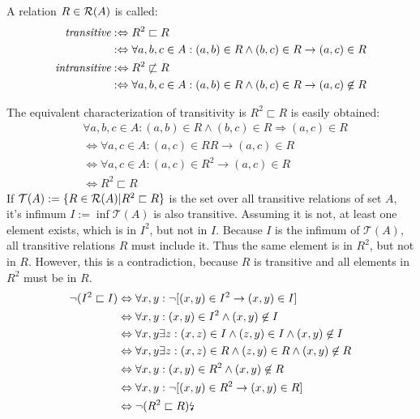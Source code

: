 \begin{definition}[Transitivity]
A relation $R \in \mathcal{R}(A)$ is called:
\begin{align}
\emph{transitive} 
&:\Leftrightarrow
R^{2} \sqsubset R
\\&:\Leftrightarrow
\forall a,b,c \in A: (a,b) \in R \wedge (b,c) \in R \rightarrow (a,c) \in R
\\
\emph{intransitive} 
&:\Leftrightarrow
R^{2} \not\sqsubset R
\\&:\Leftrightarrow
\forall a,b,c \in A: (a,b) \in R \wedge (b,c) \in R \rightarrow (a,c) \not\in R
\end{align}
\end{definition}
The equivalent characterization of transitivity is $R^{2} \sqsubset R$ is easily obtained:
\begin{align}
&\forall a,b,c \in A: (a,b) \in R \wedge (b,c) \in R \Rightarrow (a,c) \in R
\\&\Leftrightarrow
\forall a,c \in A: (a,c) \in RR \rightarrow (a,c) \in R
\\&\Leftrightarrow
\forall a,c \in A: (a,c) \in R^{2} \rightarrow (a,c) \in R
\\&\Leftrightarrow
R^{2} \sqsubset R 
\end{align}
If $\mathcal{T}(A) := \{ R \in \mathcal{R}(A) | R^{2} \sqsubset R \}$ is the set over all transitive relations of set $A$, it's infimum $I := \inf \mathcal{T}(A)$ is also transitive.
Assuming it is not, at least one element exists, which is in $I^{2}$, but not in $I$.
Because $I$ is the infimum of $\mathcal{T}(A)$, all transitive relations $R$ must include it.
Thus the same element is in $R^{2}$, but not in $R$.
However, this is a contradiction, because $R$ is transitive and all elements in $R^{2}$ must be in $R$.
\begin{align}
\neg(I^{2} \sqsubset I)
&\Leftrightarrow
\forall x,y : \neg[(x,y) \in I^{2} \rightarrow (x,y) \in I]
\\&\Leftrightarrow
\forall x,y : (x,y) \in I^{2} \wedge (x,y) \not\in I
\\&\Leftrightarrow
\forall x,y \exists z : (x,z) \in I \wedge (z,y) \in I \wedge (x,y) \not\in I
\\&\Leftrightarrow
\forall x,y \exists z : (x,z) \in R \wedge (z,y) \in R \wedge (x,y) \not\in R
\\&\Leftrightarrow
\forall x,y : (x,y) \in R^{2} \wedge (x,y) \not\in R
\\&\Leftrightarrow
\forall x,y : \neg[(x,y) \in R^{2} \rightarrow (x,y) \in R]
\\&\Leftrightarrow
\neg(R^{2} \sqsubset R) 
\text{\lightning}
\end{align}


